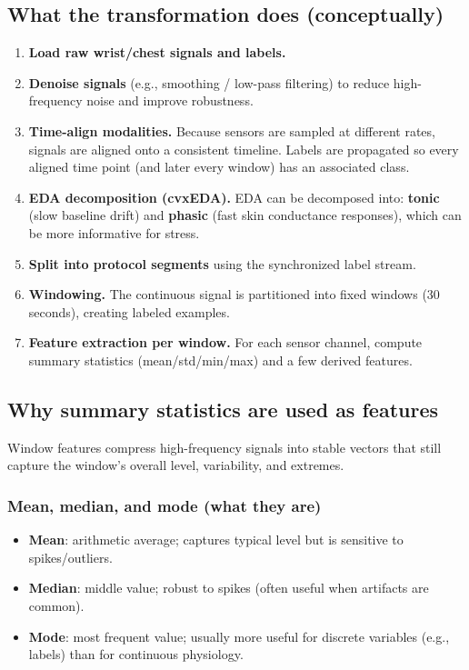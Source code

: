 \documentclass[11pt]{article}
\begin{document}
\subsection{What the transformation does (conceptually)}
\begin{enumerate}
  \item \textbf{Load raw wrist/chest signals and labels.}
  \item \textbf{Denoise signals} (e.g., smoothing / low-pass filtering) to reduce high-frequency noise and improve robustness.
  \item \textbf{Time-align modalities.} Because sensors are sampled at different rates, signals are aligned onto a consistent timeline.
        Labels are propagated so every aligned time point (and later every window) has an associated class.
  \item \textbf{EDA decomposition (cvxEDA).} EDA can be decomposed into:
        \textbf{tonic} (slow baseline drift) and \textbf{phasic} (fast skin conductance responses), which can be more informative for stress.
  \item \textbf{Split into protocol segments} using the synchronized label stream.
  \item \textbf{Windowing.} The continuous signal is partitioned into fixed windows (30 seconds), creating labeled examples.
  \item \textbf{Feature extraction per window.} For each sensor channel, compute summary statistics (mean/std/min/max) and a few derived features.
\end{enumerate}

\subsection{Why summary statistics are used as features}
Window features compress high-frequency signals into stable vectors that still capture the window's overall level, variability, and extremes.

\subsubsection*{Mean, median, and mode (what they are)}
\begin{itemize}
  \item \textbf{Mean}: arithmetic average; captures typical level but is sensitive to spikes/outliers.
  \item \textbf{Median}: middle value; robust to spikes (often useful when artifacts are common).
  \item \textbf{Mode}: most frequent value; usually more useful for discrete variables (e.g., labels) than for continuous physiology.
\end{itemize}
\end{document}
